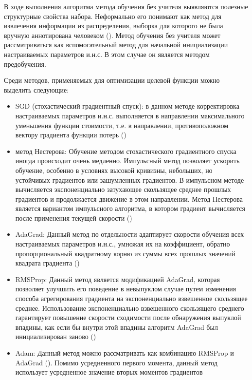 В ходе выполнения алгоритма метода обучения без учителя выявляются полезные структурные свойства
набора. Неформально его понимают как метод для извлечения информации из распределения, выборка для которого
не была вручную аннотирована человеком (). Метод обучения без учителя может рассматриваться как вспомогательный метод для начальной инициализации настраиваемых параметров и.н.с. В этом случае он является методом предобучения.

Среди методов, применяемых для оптимизации целевой функции можно выделить следующие:

\begin{itemize}
	\item SGD (стохастический градиентный спуск): в данном методе корректировка настраиваемых параметров и.н.с. выполняется в направлении максимального уменьшения функции стоимости, т.е. в направлении, противоположном вектору градиента функции потерь ()
	\item метод Нестерова: Обучение методом стохастического градиентного спуска иногда происходит очень медленно. Импульсный метод позволяет ускорить обучение, особенно в условиях высокой кривизны, небольших, но устойчивых градиентов или зашумленных градиентов. В импульсном методе вычисляется экспоненциально затухающее скользящее среднее прошлых градиентов и продолжается движение в этом направлении. Метод Нестерова является вариантом импульсного алгоритма, в котором градиент вычисляется после применения текущей скорости ()
	\item AdaGrad: Данный метод по отдельности адаптирует скорости обучения всех настраиваемых параметров и.н.с., умножая их на коэффициент, обратно пропорциональный квадратному корню из суммы всех прошлых значений квадрата градиента ()
	\item RMSProp: Данный метод является модификацией AdaGrad, которая позволяет улучшить его поведение в невыпуклом случае путем изменения способа агрегирования градиента на экспоненциально взвешенное скользящее среднее. Использование экспоненциально взвешенного скользящего среднего гарантирует повышение скорости сходимости после обнаружения выпуклой впадины, как если бы внутри этой впадины алгоритм AdaGrad был инициализирован заново ()
	\item Adam: Данный метод можно рассматривать как комбинацию RMSProp и AdaGrad (). Помимо усредненного первого момента, данный метод использует усредненное значение вторых моментов градиентов
\end{itemize} 

